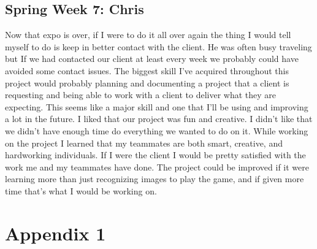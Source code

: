 \documentclass[onecolumn, draftclsnofoot,10pt, compsoc]{IEEEtran}
\begin{document}
\subsection{Spring Week 7: Chris}
Now that expo is over, if I were to do it all over again the thing I would tell myself to do is keep in better contact with the client. He was often busy traveling but If we had contacted our client at least every week we probably could have avoided some contact issues. The biggest skill I've acquired throughout this project would probably planning and documenting a project that a client is requesting and being able to work with a client to deliver what they are expecting. This seems like a major skill and one that I'll be using and improving a lot in the future. I liked that our project was fun and creative. I didn't like that we didn't have enough time do everything we wanted to do on it. While working on the project I learned that my teammates are both smart, creative, and hardworking individuals. If I were the client I would be pretty satisfied with the work me and my teammates have done. The project could be improved if it were learning more than just recognizing images to play the game, and if given more time that's what I would be working on.

\section{Appendix 1}
\end{document}
